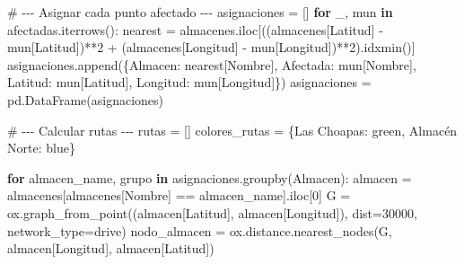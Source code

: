 \documentclass[
  spanish,
  us-letterpaper,
]{scrreprt}
\newenvironment{Shaded}{\begin{snugshade}}{\end{snugshade}}
\newcommand{\CommentTok}[1]{\textcolor[rgb]{0.37,0.37,0.37}{#1}}
\newcommand{\ControlFlowTok}[1]{\textcolor[rgb]{0.00,0.23,0.31}{\textbf{#1}}}
\newcommand{\DecValTok}[1]{\textcolor[rgb]{0.68,0.00,0.00}{#1}}
\newcommand{\KeywordTok}[1]{\textcolor[rgb]{0.00,0.23,0.31}{\textbf{#1}}}
\newcommand{\NormalTok}[1]{\textcolor[rgb]{0.00,0.23,0.31}{#1}}
\newcommand{\OperatorTok}[1]{\textcolor[rgb]{0.37,0.37,0.37}{#1}}
\newcommand{\StringTok}[1]{\textcolor[rgb]{0.13,0.47,0.30}{#1}}
\numberwithin{equation}{chapter} %
\begin{document}
\begin{Shaded}
\begin{Highlighting}[]
\CommentTok{\# {-}{-}{-} Asignar cada punto afectado {-}{-}{-}}
\NormalTok{asignaciones }\OperatorTok{=}\NormalTok{ []}
\ControlFlowTok{for}\NormalTok{ \_, mun }\KeywordTok{in}\NormalTok{ afectadas.iterrows():}
\NormalTok{    nearest }\OperatorTok{=}\NormalTok{ almacenes.iloc[((almacenes[}\StringTok{\textquotesingle{}Latitud\textquotesingle{}}\NormalTok{] }\OperatorTok{{-}}
\NormalTok{     mun[}\StringTok{\textquotesingle{}Latitud\textquotesingle{}}\NormalTok{])}\OperatorTok{**}\DecValTok{2} \OperatorTok{+}\NormalTok{ (almacenes[}\StringTok{\textquotesingle{}Longitud\textquotesingle{}}\NormalTok{] }\OperatorTok{{-}} 
\NormalTok{     mun[}\StringTok{\textquotesingle{}Longitud\textquotesingle{}}\NormalTok{])}\OperatorTok{**}\DecValTok{2}\NormalTok{).idxmin()]}
\NormalTok{    asignaciones.append(\{}\StringTok{\textquotesingle{}Almacen\textquotesingle{}}\NormalTok{: nearest[}\StringTok{\textquotesingle{}Nombre\textquotesingle{}}\NormalTok{],}
     \StringTok{\textquotesingle{}Afectada\textquotesingle{}}\NormalTok{: mun[}\StringTok{\textquotesingle{}Nombre\textquotesingle{}}\NormalTok{], }\StringTok{\textquotesingle{}Latitud\textquotesingle{}}\NormalTok{: mun[}\StringTok{\textquotesingle{}Latitud\textquotesingle{}}\NormalTok{],}
      \StringTok{\textquotesingle{}Longitud\textquotesingle{}}\NormalTok{: mun[}\StringTok{\textquotesingle{}Longitud\textquotesingle{}}\NormalTok{]\})}
\NormalTok{asignaciones }\OperatorTok{=}\NormalTok{ pd.DataFrame(asignaciones)}

\CommentTok{\# {-}{-}{-} Calcular rutas {-}{-}{-}}
\NormalTok{rutas }\OperatorTok{=}\NormalTok{ []}
\NormalTok{colores\_rutas }\OperatorTok{=}\NormalTok{ \{}\StringTok{\textquotesingle{}Las Choapas\textquotesingle{}}\NormalTok{: }\StringTok{\textquotesingle{}green\textquotesingle{}}\NormalTok{, }\StringTok{\textquotesingle{}Almacén Norte\textquotesingle{}}\NormalTok{: }\StringTok{\textquotesingle{}blue\textquotesingle{}}\NormalTok{\}}

\ControlFlowTok{for}\NormalTok{ almacen\_name, grupo }\KeywordTok{in}\NormalTok{ asignaciones.groupby(}\StringTok{\textquotesingle{}Almacen\textquotesingle{}}\NormalTok{):}
\NormalTok{    almacen }\OperatorTok{=}\NormalTok{ almacenes[almacenes[}\StringTok{\textquotesingle{}Nombre\textquotesingle{}}\NormalTok{] }\OperatorTok{==}\NormalTok{ almacen\_name].iloc[}\DecValTok{0}\NormalTok{]}
\NormalTok{    G }\OperatorTok{=}\NormalTok{ ox.graph\_from\_point((almacen[}\StringTok{\textquotesingle{}Latitud\textquotesingle{}}\NormalTok{], almacen[}\StringTok{\textquotesingle{}Longitud\textquotesingle{}}\NormalTok{]),}
\NormalTok{     dist}\OperatorTok{=}\DecValTok{30000}\NormalTok{, network\_type}\OperatorTok{=}\StringTok{\textquotesingle{}drive\textquotesingle{}}\NormalTok{)}
\NormalTok{    nodo\_almacen }\OperatorTok{=}\NormalTok{ ox.distance.nearest\_nodes(G,}
\NormalTok{     almacen[}\StringTok{\textquotesingle{}Longitud\textquotesingle{}}\NormalTok{], almacen[}\StringTok{\textquotesingle{}Latitud\textquotesingle{}}\NormalTok{])}


\end{Highlighting}
\end{Shaded}
\end{document}
